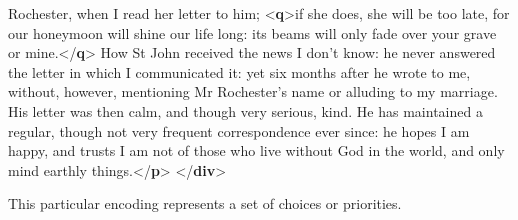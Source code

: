 \documentclass[11pt,twoside]{article}\makeatletter
\begin{document}
\begin{shaded}
\hspace*{1em}\hspace*{1em} Rochester, when I read her letter to him; {<\textbf{q}>}if she does,\mbox{}\newline 
\hspace*{1em}\hspace*{1em}\hspace*{1em}\hspace*{1em} she will be too late, for our honeymoon will shine our life\mbox{}\newline 
\hspace*{1em}\hspace*{1em}\hspace*{1em}\hspace*{1em} long: its beams will only fade over your grave or mine.{</\textbf{q}>}\mbox{}\newline 
{}\mbox{}\newline 
{}How St John received the news I don't know: he never\mbox{}\newline 
\hspace*{1em}\hspace*{1em} answered the letter in which I communicated it: yet six\mbox{}\newline 
\hspace*{1em}\hspace*{1em} months after he wrote to me, without, however, mentioning Mr\mbox{}\newline 
\hspace*{1em}\hspace*{1em} Rochester's name or alluding to my marriage. His letter was\mbox{}\newline 
\hspace*{1em}\hspace*{1em} then calm, and though very serious, kind. He has maintained\mbox{}\newline 
\hspace*{1em}\hspace*{1em} a regular, though not very frequent correspondence ever\mbox{}\newline 
\hspace*{1em}\hspace*{1em} since: he hopes I am happy, and trusts I am not of those who\mbox{}\newline 
\hspace*{1em}\hspace*{1em} live without God in the world, and only mind earthly things.{</\textbf{p}>}\mbox{}\newline 
{</\textbf{div}>}\end{shaded}\egroup\par \par This particular encoding represents a set of choices or priorities.
\end{document}
